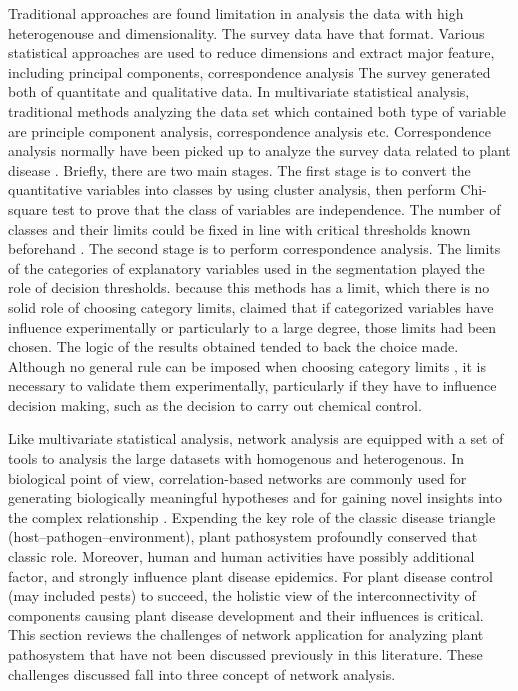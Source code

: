 Traditional approaches are found limitation in analysis the data with high heterogenouse and dimensionality. The survey data have that format. Various statistical approaches are used to reduce dimensions and extract major feature, including principal components, correspondence analysis The survey generated both of quantitate and qualitative data. In multivariate statistical analysis, traditional methods analyzing the data set which contained both type of variable are principle component analysis, correspondence analysis etc. Correspondence analysis normally have been picked up to analyze the survey data related to plant disease . Briefly, there are two main stages. The first stage is to convert the quantitative variables into classes by using cluster analysis, then perform Chi-square test to prove that the class of variables are independence. The number of classes and their limits could be fixed in line with critical thresholds known beforehand . The second stage is to perform correspondence analysis. The limits of the categories of explanatory variables used in the segmentation played the role of decision thresholds. because this methods has a limit, which there is no solid role of choosing category limits,  claimed that if categorized variables have influence experimentally or particularly to a large degree, those limits had been chosen. The logic of the results obtained tended to back the choice made. Although no general rule can be imposed when choosing category limits , it is necessary to validate them experimentally, particularly if they have to influence decision making, such as the decision to carry out chemical control.

Like multivariate statistical analysis, network analysis are equipped with a set of tools to analysis the large datasets with homogenous and heterogenous. In biological point of view, correlation-based networks are commonly used for generating biologically meaningful hypotheses and for gaining novel insights into the complex relationship . Expending the key role of the classic disease triangle (host–pathogen–environment), plant pathosystem profoundly conserved that classic role. Moreover, human and human activities have possibly additional factor, and strongly influence plant disease epidemics. For plant disease control (may included pests) to succeed, the holistic view of the interconnectivity of components causing plant disease development and their influences is critical. This section reviews the challenges of network application for analyzing plant pathosystem that have not been discussed previously in this literature. These challenges discussed fall into three concept of network analysis.

